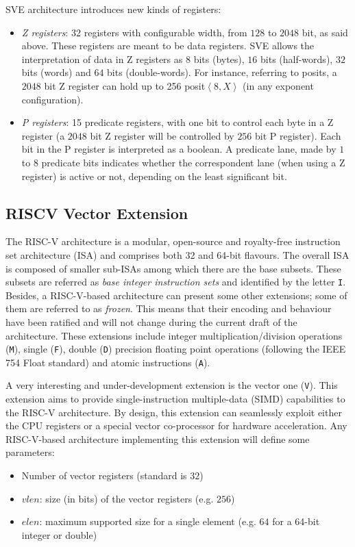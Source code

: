 SVE architecture introduces new kinds of registers:
\begin{itemize}
    \item \textit{Z registers}: 32 registers with configurable width, from $128$ to $2048$ bit, as said above. These registers are meant to be data registers. SVE allows the interpretation of data in Z registers as $8$ bits (bytes), $16$ bits (half-words), $32$ bits (words) and $64$ bits (double-words). For instance, referring to posits, a $2048$ bit Z register can hold up to 256 posit$\left <8,X\right>$ (in any exponent configuration).
    \item \textit{P registers}: 15 predicate registers, with one bit to control each byte in a Z register (a $2048$ bit Z register will be controlled by $256$ bit P register). Each bit in the P register is interpreted as a boolean. A predicate lane, made by $1$ to $8$ predicate bits indicates whether the correspondent lane (when using a Z register) is active or not, depending on the least significant bit.
\end{itemize}


\subsection{RISCV Vector Extension}

The RISC-V \cite{riscvisa} architecture is a modular, open-source and royalty-free instruction set architecture (ISA) and comprises both 32 and 64-bit flavours. The overall ISA is composed of smaller sub-ISAs among which there are the base subsets. These subsets are referred as \textit{base integer instruction sets} and identified by the letter \texttt{I}. Besides, a RISC-V-based architecture can present some other extensions; some of them are referred to as \textit{frozen}. This means that their encoding and behaviour have been ratified and will not change during the current draft of the architecture. These extensions include integer multiplication/division operations (\texttt{M}), single (\texttt{F}), double (\texttt{D}) precision floating point operations (following the IEEE 754 Float standard) and atomic instructions (\texttt{A}).

A very interesting and under-development extension is the vector one (\texttt{V}). This extension aims to provide single-instruction multiple-data (SIMD) capabilities to the RISC-V architecture. By design, this extension can seamlessly exploit either the CPU registers or a special vector co-processor for hardware acceleration. Any RISC-V-based architecture implementing this extension will define some parameters:
\begin{itemize}
    \item Number of vector registers (standard is $32$)
    \item $vlen$: size (in bits) of the vector registers (e.g. $256$)
    \item $elen$: maximum supported size for a single element (e.g. $64$ for a 64-bit integer or double)
\end{itemize}

